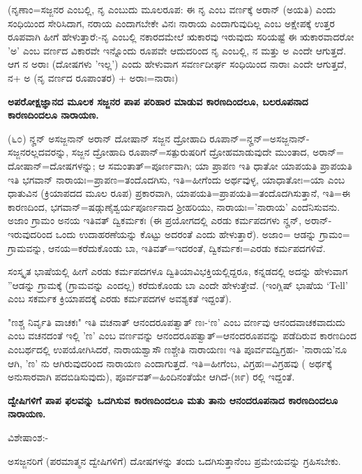 (ನೃಣಾಂ=ಸಜ್ಜನರ ಎಂಬಲ್ಲಿ, ನೃ ಎಂಬುದು ಮೂಲರೂಪ: ಈ ನೃ ಎಂಬ ವರ್ಣಕ್ಕೆ ಅರಾನ್ (ಅಯತಿ) ಎಂದು ಸಂಧಿಯಿಂದ ಸೇರಿಸಿದಾಗ, ನರಾಯ ಎಂದಾಗಬೇಕೇ ವಿನಃ ನಾರಾಯ ಎಂದಾಗುವುದಿಲ್ಲ ಎಂಬ ಅಕ್ಷೇಪಕ್ಕೆ ಉತ್ತರ ರೂಪವಾಗಿ ಹೀಗೆ ಹೇಳುತ್ತಾರೆ:-ನೃ ಎಂಬಲ್ಲಿ ನಕಾರದಮೇಲೆ ಋಕಾರವು ಇರುವುದು ಸರಿಯಷ್ಟೆ ಈ ಋಕಾರವಾದರೋ 'ಅ' ಎಂಬ ವರ್ಣದ ವಿಕಾರವೇ ಇನ್ನೊಂದು ರೂಪವೇ ಆದುದರಿಂದ ನೃ ಎಂಬಲ್ಲಿ, ನ ಮತ್ತು ಅ ಎಂದೇ ಆಗುತ್ತದೆ. ಆಗ ನ ಅರಾಃ (ದೋಷಗಳು 'ಇಲ್ಲ') ಎಂದು ಹೇಳುವಾಗ ಸವರ್ಣದೀರ್ಘ ಸಂಧಿಯಿಂದ ನಾರಾಃ ಎಂದೇ ಆಗುತ್ತದೆ, ನ+ ಅ (ನೃ ವರ್ಣದ ರೂಪಾಂತರ) + ಅರಾಃ=ನಾರಾಃ)

\begin{center}
\textbf{ಅಪರೋಕ್ಷಜ್ಞಾನದ ಮೂಲಕ ಸಜ್ಜನರ ಪಾಪ ಪರಿಹಾರ ಮಾಡುವ ಕಾರಣದಿಂದಲೂ, ಬಲರೂಪನಾದ ಕಾರಣದಿಂದಲೂ ನಾರಾಯಣ.}
\end{center}

(೬೦) ನೄನ್ ಅಸಜ್ಜನಾನ್ ಅರಾನ್ ದೋಷಾನ್ ಸಜ್ಜನ ದ್ರೋಹಾದಿ ರೂಪಾನ್=ನೄನ್=ಅಸಜ್ಜನಾನ್-ಸಜ್ಜನರಲ್ಲದವರನ್ನು, ಸಜ್ಜನ ದ್ರೋಹಾದಿ ರೂಪಾನ್=ಸತ್ಪುರುಷರಿಗೆ ದ್ರೋಹಮಾಡುವುದೇ ಮುಂತಾದ, ಅರಾನ್= ದೋಷಾನ್=ದೋಷಗಳನ್ನು; ಆ ಸಮಂತಾತ್=ಪೂರ್ಣವಾಗಿ; ಯಾ ಪ್ರಾಪಣ ಇತಿ ಧಾತೋ ಯಾಪಯತಿ ಪ್ರಾಪಯತಿ ಇತಿ ಭಗವಾನ್ ನಾರಾಯಃ=ಪ್ರಾಪಣ=ತಂದೊದಗಿಸು, ಇತಿ=ಹೀಗೆಂದು ಅರ್ಥವುಳ್ಳ, ಯಾಧಾತೋಃ=ಯಾ ಎಂಬ ಧಾತುವಿನ (ಕ್ರಿಯಾಪದದ ಮೂಲ ರೂಪ) ಪ್ರಕಾರವಾಗಿ, ಯಾಪಯತಿ=ಪ್ರಾಪಯತಿ=ತಂದೊದಗಿಸುತ್ತಾನೆ, ಇತಿ=ಈ ಕಾರಣದಿಂದ, ಭಗವಾನ್=ಷಡ್ಗುಣೈಶ್ವರ್ಯಪೂರ್ಣನಾದ ಶ‍್ರೀಹರಿಯು, ನಾರಾಯಃ='ನಾರಾಯ' ಎಂದೆನಿಸುವನು. ಅಜಾಂ ಗ್ರಾಮಂ ಅನಯ ಇತಿವತ್ ದ್ವಿಕರ್ಮಕಃ (ಈ ಪ್ರಯೋಗದಲ್ಲಿ ಎರಡು ಕರ್ಮಪದಗಳು ನೄನ್, ಅರಾನ್-ಇರುವುದರಿಂದ ಒಂದು ಉದಾಹರಣೆಯನ್ನು ಕೊಟ್ಟು ಅದರಂತೆ ಎಂದು ಹೇಳುತ್ತಾರೆ). ಅಜಾಂ= ಆಡನ್ನು ಗ್ರಾಮಂ= ಗ್ರಾಮವನ್ನು, ಆನಯ=ಕರೆದುಕೊಂಡು ಬಾ, ಇತಿವತ್=ಇದರಂತೆ, ದ್ವಿಕರ್ಮಕಃ=ಎರಡು ಕರ್ಮಪದಗಳಿವೆ.

ಸಂಸ್ಕೃತ ಭಾಷೆಯಲ್ಲಿ ಹೀಗೆ ಎರಡು ಕರ್ಮಪದಗಳೂ ದ್ವಿತಿಯಾವಿಭಕ್ತಿಯಲ್ಲಿದ್ದರೂ, ಕನ್ನಡದಲ್ಲಿ ಅದನ್ನು ಹೇಳುವಾಗ ''ಆಡನ್ನು ಗ್ರಾಮಕ್ಕೆ (ಗ್ರಾಮವನ್ನು ಎಂದಲ್ಲ) ಕರೆದುಕೊಂಡು ಬಾ ಎಂದೇ ಹೇಳುತ್ತೇವೆ. (ಇಂಗ್ಲಿಷ್ ಭಾಷೆಯ `Tell' ಎಂಬ ಸಕರ್ಮಕ ಕ್ರಿಯಾಪದಕ್ಕೆ ಎರಡು ಕರ್ಮಪದಗಳ ಅವಶ್ಯಕತೆ ಇದ್ದಂತೆ).

"ಣಶ್ಚ ನಿರ್ವೃತಿ ವಾಚಕಃ" ಇತಿ ವಚನಾತ್ ಆನಂದರೂಪತ್ವಾತ್ ಣಃ-`ಣ' ಎಂಬ ವರ್ಣವು ಆನಂದವಾಚಕವಾದುದು ಎಂಬ ವಚನದಂತೆ ಇಲ್ಲಿ 'ಣ' ಎಂಬ ವರ್ಣವನ್ನು ಆನಂದರೂಪತ್ವಾತ್=ಆನಂದರೂಪವನ್ನು ಪಡೆದಿರುವ ಕಾರಣದಿಂದ ಎಂಬರ್ಥದಲ್ಲಿ ಉಪಯೋಗಿಸಿದರೆ, ನಾರಾಯಶ್ವಾಸೌ ಣಶ್ಚೇತಿ ನಾರಾಯಣಃ ಇತಿ ಪೂರ್ವವದ್ವಿಗ್ರಹಃ- 'ನಾರಾಯ'ನೂ ಆಗಿ, 'ಣ' ನು ಆಗಿರುವುದರಿಂದ ನಾರಾಯಣ ಎಂದಾಗುತ್ತದೆ. ಇತಿ=ಹೀಗೆಂಬ, ವಿಗ್ರಹಃ=ವಿಗ್ರಹವು ( ಅರ್ಥಕ್ಕೆ ಅನುಸಾರವಾಗಿ ಪದಬಿಡಿಸುವುದು), ಪೂರ್ವವತ್=ಹಿಂದಿನಂತೆಯೇ ಆಗಿದೆ-(೫೯) ರಲ್ಲಿ ಇದ್ದಂತೆ.

\begin{center}
\textbf{ ದ್ವೇಷಿಗಳಿಗೆ ಪಾಪ ಫಲವನ್ನು ಒದಗಿಸುವ ಕಾರಣದಿಂದಲೂ ಮತು ತಾನು ಆನಂದರೂಪನಾದ ಕಾರಣದಿಂದಲೂ ನಾರಾಯಣ.}
\end{center}

\noindent
ವಿಶೇಷಾಂಶ:-

ಅಸಜ್ಜನರಿಗೆ (ಪರಮಾತ್ಮನ ದ್ವೇಷಿಗಳಿಗೆ) ದೋಷಗಳನ್ನು ತಂದು ಒದಗಿಸುತ್ತಾನೆಂಬ ಪ್ರಮೇಯವನ್ನು ಗ್ರಹಿಸಬೇಕು.

